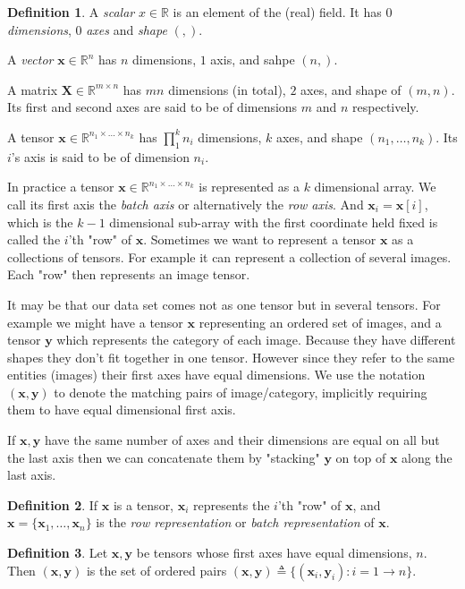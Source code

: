 \documentclass[11pt, a4paper]{report}
\theoremstyle{plain}
\theoremstyle{definition}
\newtheorem{mydef}{Definition}[chapter]
\theoremstyle{remark}
\newcommand{\R}{\mathbb{R}}
\newcommand{\X}{\mathbf{X}}
\newcommand{\x}{\mathbf{x}}
\newcommand{\y}{\mathbf{y}}
\begin{document}
\begin{mydef}
\label{def:tensor}
A \emph{scalar} $x \in \R$ is an element of the (real) field.
It has $0$ \emph{dimensions}, $0$ \emph{axes} and \emph{shape} $(,)$.

A \emph{vector} $\x \in \R^n$ has $n$ dimensions, $1$ axis, and sahpe $(n,)$.

A matrix $\X \in \R^{m \times n}$ has $mn$ dimensions (in total), $2$ axes, and shape of $(m,n)$.
Its first and second axes are said to be of dimensions $m$ and $n$ respectively.

A tensor $\x \in \R^{n_1 \times \dots \times n_k}$
has $\prod_1^k n_i$ dimensions, $k$ axes, and shape $(n_1, \dots, n_k)$.
Its $i$'s axis is said to be of dimension $n_i$.
\end{mydef}

In practice a tensor $\x \in \R^{n_1 \times \dots \times n_k}$
is represented as a $k$ dimensional array.
We call its first axis the \emph{batch axis} or alternatively the \emph{row
axis}. And $\x_i = \x[i]$, which is the $k-1$ dimensional sub-array with the first
coordinate held fixed is called the $i$'th "row" of $\x$.
Sometimes we want to represent a tensor $\x$ as a collections of tensors. For
example it can represent a collection of several images. Each "row" then
represents an image tensor.

It may be that our data set comes not as one tensor but in several tensors.
For example we might have a tensor $\x$ representing an ordered set of images,
and a tensor $\y$ which represents the category of each image.
Because they have different shapes they don't fit together in one tensor.
However since they refer to the same entities (images) their first axes have equal
dimensions. We use the notation $(\x, \y)$ to denote the matching pairs of
image/category, implicitly requiring them to have equal dimensional first axis.

If $\x,\y$ have the same number of axes and their dimensions are equal on all
but the last axis then we can concatenate them by "stacking" $\y$ on top of $\x$
along the last axis.

\begin{mydef}
\label{def:rowrep}
If $\x$ is a tensor, $\x_i$ represents the $i$'th "row" of $\x$,
and $\x = \{\x_1, \dots , \x_n\}$ is the \emph{row representation} or 
\emph{batch
representation} of $\x$.
\end{mydef}

\begin{mydef}
\label{def:pairnotaion}
Let $\x, \y$ be tensors whose first axes have equal dimensions, $n$. Then $(\x, \y)$
is the set of ordered pairs $(\x,\y) \triangleq \{(\x_i,\y_i) : i=1 \to n\}$.
\end{mydef}
\end{document}
